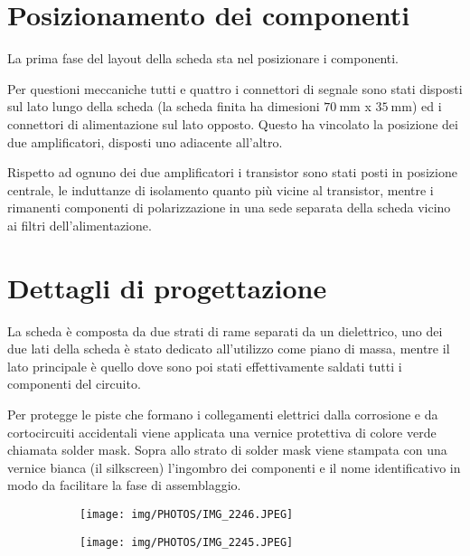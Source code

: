 \documentclass[12pt,oneside]{book}
\begin{document}
\section{Posizionamento dei componenti}
La prima fase del layout della scheda sta nel posizionare i componenti.

Per questioni meccaniche tutti e quattro i connettori di segnale sono stati disposti sul lato lungo della scheda (la scheda finita ha dimesioni $\SI{70}{\milli\meter}$ x $\SI{35}{\milli\meter}$) ed i connettori di alimentazione sul lato opposto. Questo ha vincolato la posizione dei due amplificatori, disposti uno adiacente all'altro.

Rispetto ad ognuno dei due amplificatori i transistor sono stati posti in posizione centrale, le induttanze di isolamento quanto più vicine al transistor, mentre i rimanenti componenti di polarizzazione in una sede separata della scheda vicino ai filtri dell'alimentazione.


\section{Dettagli di progettazione}
La scheda è composta da due strati di rame separati da un dielettrico, uno dei due lati della scheda è stato dedicato all'utilizzo come piano di massa, mentre il lato principale è quello dove sono poi stati effettivamente saldati tutti i componenti del circuito.

Per protegge le piste che formano i collegamenti elettrici dalla corrosione e da cortocircuiti accidentali viene applicata una vernice protettiva di colore verde chiamata solder mask. Sopra allo strato di solder mask viene stampata con una vernice bianca (il silkscreen) l'ingombro dei componenti e il nome identificativo in modo da facilitare la fase di assemblaggio.

\begin{figure}[!htbp]
    \centering
    \begin{subfigure}[t]{0.48\textwidth}
        \centering
        \texttt{[image: img/PHOTOS/IMG\_2246.JPEG]}
        \caption{}
    \end{subfigure}
    \hfill
    \begin{subfigure}[t]{0.48\textwidth}
        \centering
        \texttt{[image: img/PHOTOS/IMG\_2245.JPEG]}
        \caption{}
    \end{subfigure}
    \hfill
\end{figure}
\end{document}
